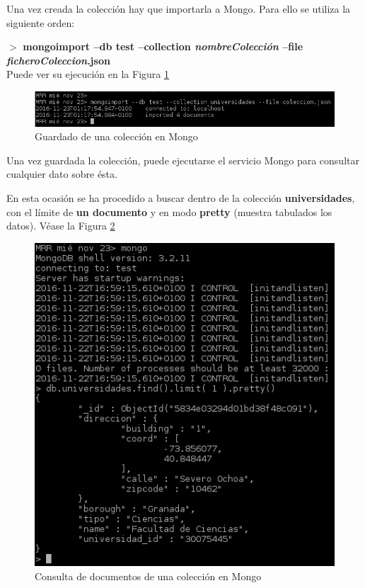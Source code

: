 	Una vez creada la colección hay que importarla a Mongo. Para ello se utiliza la siguiente orden:
	
	$ > $ \textbf{mongoimport --db test --collection \textit{nombreColección} --file \textit{ficheroColeccion}.json}
	\\
	
	Puede ver su ejecución en la Figura \ref{fig:figura93}
	
	\begin{figure}[H] %
		\centering
		\includegraphics[scale=0.7]{figuras/figura93.png} 
		\caption{Guardado de una colección en Mongo} 
		\label{fig:figura93}
	\end{figure}

	Una vez guardada la colección, puede ejecutarse el servicio Mongo para consultar cualquier dato sobre ésta.
	
	En esta ocasión se ha procedido a buscar dentro de la colección \textbf{universidades}, con el límite de \textbf{un documento} y en modo \textbf{pretty} (muestra tabulados los datos). Véase la Figura \ref{fig:figura94} 
	
	\begin{figure}[H] %
		\centering
		\includegraphics[scale=1]{figuras/figura94.png} 
		\caption{Consulta de documentos de una colección en Mongo} 
		\label{fig:figura94}
	\end{figure}
	
